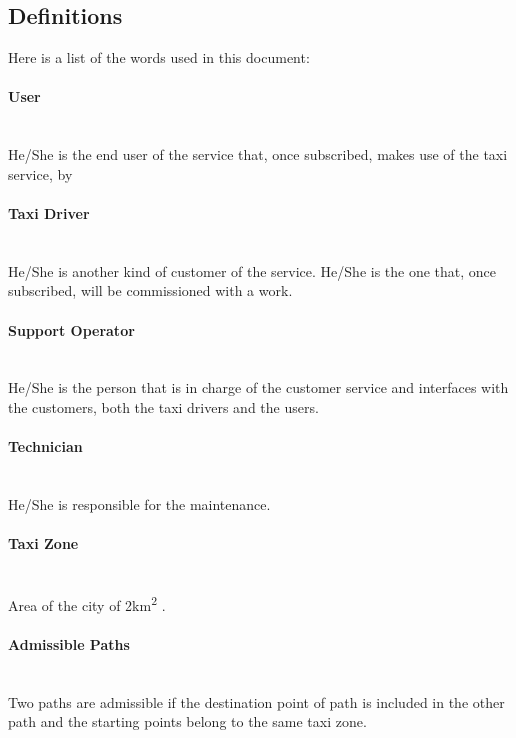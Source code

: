 \subsection{Definitions}
\label{sub:def}
Here is a list of the words used in this document:

\paragraph{User} \hfill \\
\label{def:user} He/She is the end user of the service that, once subscribed, makes use of the taxi service, by 

\paragraph{Taxi Driver} \hfill \\
\label{def:taxidriver} He/She is another kind of customer of the service. He/She is the one that, once subscribed, will be commissioned with a work.

\paragraph{Support Operator} \hfill \\
\label{def:operator} He/She is the person that is in charge of the customer service and interfaces with the customers, both the taxi drivers and the users.

\paragraph{Technician} \hfill \\
\label{def:technician} He/She is responsible for the maintenance.

\paragraph{Taxi Zone} \hfill \\
\label{def:taxi_zone} Area of the city of 2km\textsuperscript{2} .

\paragraph{Admissible Paths} \hfill \\
\label{def:admissible} Two paths are admissible if the destination point of path is included in the other path and the starting points belong to the same taxi zone.


